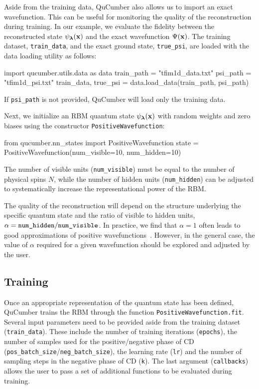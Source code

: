 \documentclass[submission, Phys, hidelnks]{SciPost}
\begin{document}
Aside from the training data, QuCumber also allows us to import an exact
wavefunction. This can be useful for monitoring the quality of the
reconstruction during training. In our example, we evaluate the fidelity between
the reconstructed state $\psi_{\bm{\lambda}}(\bf{x})$ and the exact wavefunction
$\Psi(\bf{x})$. The training dataset, \verb|train_data|, and the exact ground
state, \verb|true_psi|, are loaded with the data loading utility as follows:
\begin{python}
import qucumber.utils.data as data
train_path = "tfim1d_data.txt"
psi_path = "tfim1d_psi.txt"
train_data, true_psi = data.load_data(train_path, psi_path)
\end{python}
If \verb|psi_path| is not provided, QuCumber will load only the training data.

Next, we initialize an RBM quantum state $\psi_{\bm{\lambda}}(\bf{x})$ with
random weights and zero biases using the constructor \verb|PositiveWavefunction|:
\begin{python}
from qucumber.nn_states import PositiveWavefunction
state = PositiveWavefunction(num_visible=10, num_hidden=10)
\end{python}
The number of visible units (\verb|num_visible|) must be equal to the number
of physical spins $N$, while the number of hidden units (\verb|num_hidden|) can
 be adjusted to systematically increase the representational power of the RBM.\@

The quality of the reconstruction will depend on the structure underlying the
specific quantum state and the ratio of visible to hidden units,
$\alpha = \verb|num_hidden|/\verb|num_visible|$.
In practice, we find that $\alpha = 1$ often leads to good
approximations of positive wavefunctions~\cite{torlai_neural-network_2018}.
However, in the general case, the value of $\alpha$ required for a given
wavefunction should be explored and adjusted by the user.


\subsection{Training}
Once an appropriate representation of the quantum state has been defined,
QuCumber trains the RBM through the function \verb|PositiveWavefunction.fit|.
Several input parameters need to be provided aside from the training dataset
(\verb|train_data|). These include the number of training iterations
(\verb|epochs|), the number of samples used for the positive/negative phase of
CD (\verb|pos_batch_size|/\verb|neg_batch_size|), the learning rate (\verb|lr|)
and the number of sampling steps in the negative phase of CD (\verb|k|). The
last argument (\verb|callbacks|) allows the user to pass a set of additional
functions to be evaluated during training.
\end{document}
